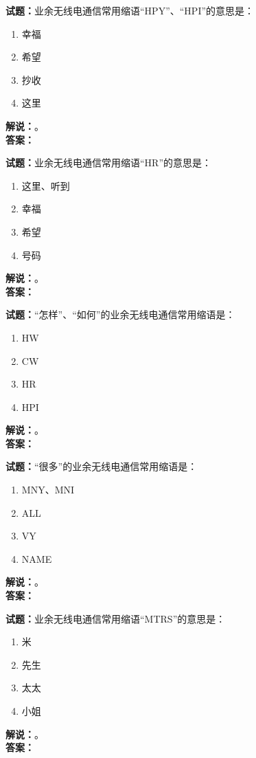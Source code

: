 \documentclass{ctexbook}
\begin{document}
\noindent\textbf{试题：}业余无线电通信常用缩语“HPY”、“HPI”的意思是：
\begin{enumerate}[leftmargin=3em]
\item 幸福
\item 希望
\item 抄收
\item 这里
\end{enumerate}
\noindent\textbf{解说：}\textbf{}。\\\noindent\textbf{答案：}

\bigskip




\noindent\textbf{试题：}业余无线电通信常用缩语“HR”的意思是：
\begin{enumerate}[leftmargin=3em]
\item 这里、听到
\item 幸福
\item 希望
\item 号码
\end{enumerate}
\noindent\textbf{解说：}\textbf{}。\\\noindent\textbf{答案：}

\bigskip




\noindent\textbf{试题：}“怎样”、“如何”的业余无线电通信常用缩语是：
\begin{enumerate}[leftmargin=3em]
\item HW
\item CW
\item HR
\item HPI
\end{enumerate}
\noindent\textbf{解说：}\textbf{}。\\\noindent\textbf{答案：}

\bigskip




\noindent\textbf{试题：}“很多”的业余无线电通信常用缩语是：
\begin{enumerate}[leftmargin=3em]
\item MNY、MNI
\item ALL
\item VY
\item NAME
\end{enumerate}
\noindent\textbf{解说：}\textbf{}。\\\noindent\textbf{答案：}

\bigskip




\noindent\textbf{试题：}业余无线电通信常用缩语“MTRS”的意思是：
\begin{enumerate}[leftmargin=3em]
\item 米
\item 先生
\item 太太
\item 小姐
\end{enumerate}
\noindent\textbf{解说：}\textbf{}。\\\noindent\textbf{答案：}
\end{document}
